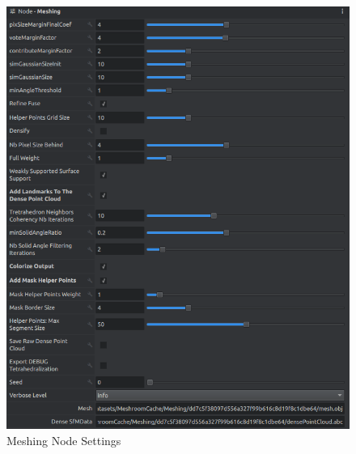 \documentclass[12pt]{report}
\begin{document}
\begin{figure}[H]%
  \centering
  \includegraphics[width=1\textwidth]{meshing_2.png}
\caption{Meshing Node Settings}
\label{fig:meshing2_big}
\end{figure}


\end{document}
